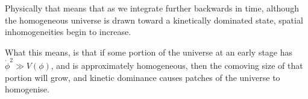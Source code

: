 Physically that means that as we integrate further backwards in time, although the homogeneous universe is drawn toward a kinetically dominated state, spatial inhomogeneities begin to increase.

What this means, is that if some portion of the universe at an early stage has $\dot{\phi}^2 \gg V(\phi)$, and is approximately homogeneous, then the comoving size of that portion will grow, and kinetic dominance causes patches of the universe to homogenise.


